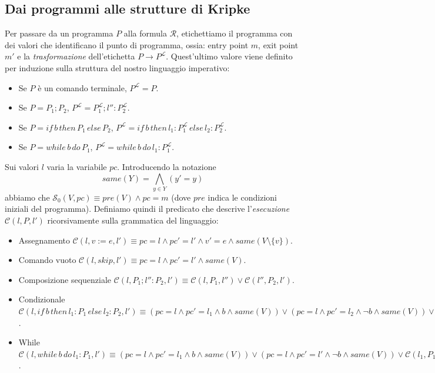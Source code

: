 \documentclass[a4paper,oneside,titlepage]{book}
\begin{document}
\subsection{Dai programmi alle strutture di Kripke}
Per passare da un programma $P$ alla formula $\mathcal{R}$, etichettiamo il programma con dei valori che identificano il punto di programma, ossia: entry point $m$, exit point $m'$ e la \textit{trasformazione} dell'etichetta $P \rightarrow P^\mathcal{L}$. Quest'ultimo valore viene definito per induzione sulla struttura del nostro linguaggio imperativo:
\begin{itemize}
    \item Se $P$ è un comando terminale, $P^\mathcal{L} = P$.
    \item Se $P = P_1;P_2$, $P^\mathcal{L} = P^\mathcal{L}_1 ; l'':P^\mathcal{L}_2$.
    \item Se $P = if \, b \, then \, P_1 \, else \, P_2$, $P^\mathcal{L} = if \, b \, then \, l_1:P^\mathcal{L}_1 \, else \, l_2:P^\mathcal{L}_2$.
    \item Se $P = while \, b \, do \, P_1$, $P^\mathcal{L} = while \, b \, do \, l_1:P^\mathcal{L}_1$.
\end{itemize}
Sui valori $l$ varia la variabile $pc$. Introducendo la notazione
\[ same(Y) = \bigwedge_{y \in Y} (y'=y) \]
abbiamo che $\mathcal{S}_0 (V,pc) \equiv pre(V) \wedge pc=m$ (dove $pre$ indica le condizioni iniziali del programma). Definiamo quindi il predicato che descrive l'\textit{esecuzione} $\mathcal{C} (l,P,l')$ ricorsivamente sulla grammatica del linguaggio:
\begin{itemize}
    \item Assegnamento $\mathcal{C} (l, v:=e, l') \equiv pc=l \wedge pc'=l' \wedge v'=e \wedge same(V \setminus \{ v \})$.
    \item Comando vuoto $\mathcal{C} (l, skip, l') \equiv pc=l \wedge pc'=l' \wedge same(V)$.
    \item Composizione sequenziale $\mathcal{C} (l, P_1 ; l'':P_2, l') \equiv \mathcal{C} (l, P_1, l'') \vee \mathcal{C} (l'', P_2, l')$.
    \item Condizionale $\mathcal{C} (l, if \, b \, then \, l_1:P_1 \, else \, l_2:P_2, l') \equiv (pc=l \wedge pc'=l_1 \wedge b \wedge same(V)) \vee (pc=l \wedge pc'=l_2 \wedge \neg b \wedge same(V)) \vee \mathcal{C} (l_1, P_1, l') \vee \mathcal{C} (l_2, P_2, l')$.
    \item While $\mathcal{C} (l, while \, b \, do \, l_1:P_1, l') \equiv (pc=l \wedge pc'=l_1 \wedge b \wedge same(V)) \vee (pc=l \wedge pc'=l' \wedge \neg b \wedge same(V)) \vee \mathcal{C} (l_1, P_1, l)$.
\end{itemize}
\end{document}
